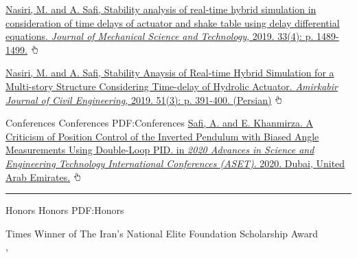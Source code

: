 \documentclass[a4paper,MMMyyyy,nonstopmode]{ResumeTemplate}
\begin{document}
\begin{Body}
\begingroup
\renewcommand{\MaxNumberedItem}{[88]}

\BigGap
\NumberedItem{[1]}
\href{https://link.springer.com/article/10.1007/s12206-019-0301-6}
{Nasiri, M. and \underline{A. Safi}, Stability analysis of real-time hybrid simulation in consideration of time delays of actuator and shake table using delay differential equations. \textit{Journal of Mechanical Science and Technology}, 2019. 33(4): p. 1489-1499.} \includegraphics[height=9pt]{icons/hand-cursor.png}

\Gap
\NumberedItem{[2]}
\href{https://ceej.aut.ac.ir/article_2911.html}
{Nasiri, M. and \underline{A. Safi}, Stability Anaysis of Real-time Hybrid Simulation for a Multi-story Structure Considering Time-delay of Hydrolic Actuator. \textit{Amirkabir Journal of Civil Engineering}, 2019. 51(3): p. 391-400. (Persian)}
\includegraphics[height=9pt]{icons/hand-cursor.png}
\endgroup

\BigGap
\SubSection
{Conferences}
{Conferences}
{PDF:Conferences}
\begingroup
\renewcommand{\MaxNumberedItem}{[88]}
\BigGap
\NumberedItem{[3]}
\href{https://ieeexplore.ieee.org/document/9118277}
{\underline{Safi, A}. and E. Khanmirza. A Criticism of Position Control of the Inverted Pendulum with Biased Angle Measurements Using Double-Loop PID. in \textit{2020 Advances in Science and Engineering Technology International Conferences (ASET)}. 2020. Dubai, United Arab Emirates.}
\includegraphics[height=9pt]{icons/hand-cursor.png}
\endgroup


\textcolor{Forestg}{\hrule height 0.1cm}

\Section
{Honors}
{Honors}
{PDF:Honors}

\Gap
{} Times Winner of The Iran's National Elite Foundation Scholarship Award\\
 \hfill
{}, 
\vspace{5pt}


\end{Body}
\end{document}
